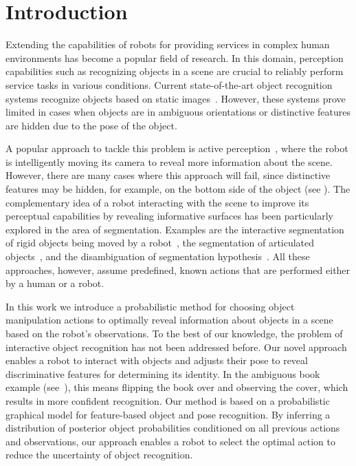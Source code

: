 \section{Introduction}


Extending the capabilities of robots for providing services in complex human environments has become a popular field of research.
In this domain, perception capabilities such as recognizing objects in a scene are crucial to reliably perform service tasks in various conditions.
Current state-of-the-art object recognition systems recognize objects based on static images~\cite{tang2012textured,van2013fusing}.
However, these systems prove limited in cases when objects are in ambiguous orientations or distinctive features are hidden due to the pose of the object.

A popular approach to tackle this problem is active perception~\cite{atanasov2013hypothesis}, where the robot is intelligently moving its camera to reveal more information about the scene.
However, there are many cases where this approach will fail, since distinctive features may be hidden, for example, on the bottom side of the object (see ).
The complementary idea of a robot interacting with the scene to improve its perceptual capabilities by revealing informative surfaces has been particularly explored in the area of segmentation.
Examples are the interactive segmentation of rigid objects being moved by a robot~\cite{fitzpatrick_active_vision,KenneyInteractive}, the segmentation of articulated objects~\cite{Katz-WS-MM-ICRA2011}, and the disambiguation of segmentation hypothesis~\cite{bergstrom11icvs}.
All these approaches, however, assume predefined, known actions that are performed either by a human or a robot.

In this work we introduce a probabilistic method for choosing object manipulation actions to optimally reveal information about objects in a scene based on the robot's observations.
To the best of our knowledge, the problem of interactive object recognition has not been addressed before. 
Our novel approach enables a robot to interact with objects and adjusts their pose to reveal discriminative features for determining its identity.
In the ambiguous book example (see~), this means flipping the book over and observing the cover, which results in more confident recognition.
Our method is based on a probabilistic graphical model for feature-based object and pose recognition.
By inferring a distribution of posterior object probabilities conditioned on all previous actions and observations, our approach enables a robot to select the optimal action to reduce the uncertainty of object recognition.

